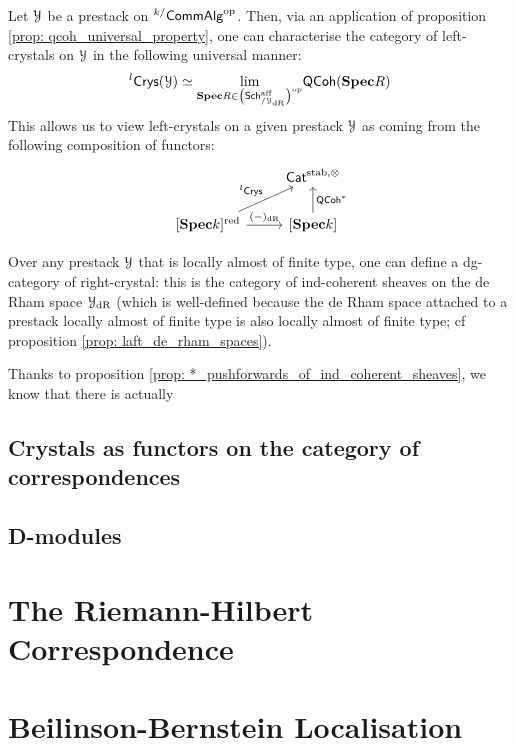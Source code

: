                 \begin{remark} \label{remark: universal_property_left_crystals}
                    Let $\mathcal{Y}$ be a prestack on ${}^{k/}\mathsf{Comm}\mathsf{Alg}^{\mathrm{op}}$. Then, via an application of proposition \ref{prop: qcoh_universal_property}, one can characterise the category of left-crystals on $\mathcal{Y}$ in the following universal manner:
                        $${}^l\mathsf{Crys}(\mathcal{Y}) \simeq \underset{\mathbf{Spec} R \in \left(\mathsf{Sch}^{\mathrm{aff}}_{/\mathcal{Y}_{\mathrm{dR}}}\right)^{\mathrm{op}}}{\operatorname{lim}} \mathsf{QCoh}(\mathbf{Spec} R)$$
                    This allows us to view left-crystals on a given prestack $\mathcal{Y}$ as coming from the following composition of functors:
                        $$
                            \begin{tikzcd}
                            	& {\Cat^{\stab, \tensor}} \\
                            	{[\Spec k]^{\red} } & {[\Spec k]}
                            	\arrow["{(-)_{\dR}}", from=2-1, to=2-2]
                            	\arrow["{\QCoh^*}"', from=2-2, to=1-2]
                            	\arrow["{{}^{l}\Crys}", from=2-1, to=1-2]
                            \end{tikzcd}
                        $$
                \end{remark}
                
                \begin{definition} \label{def: right_crystals}
                    Over any prestack $\mathcal{Y}$ that is locally almost of finite type, one can define a dg-category of right-crystal: this is the category of ind-coherent sheaves on the de Rham space $\mathcal{Y}_{\mathrm{dR}}$ (which is well-defined because the de Rham space attached to a prestack locally almost of finite type is also locally almost of finite type; cf proposition \ref{prop: laft_de_rham_spaces}). 
                \end{definition}
                \begin{remark} \label{remark: universal_property_right_crystals}
                    Thanks to proposition \ref{prop: *_pushforwards_of_ind_coherent_sheaves}, we know that there is actually 
                \end{remark}
        
        \subsection{Crystals as functors on the category of correspondences}
        
        \subsection{D-modules}
        
    \section{The Riemann-Hilbert Correspondence}
    
    \section{Beilinson-Bernstein Localisation}